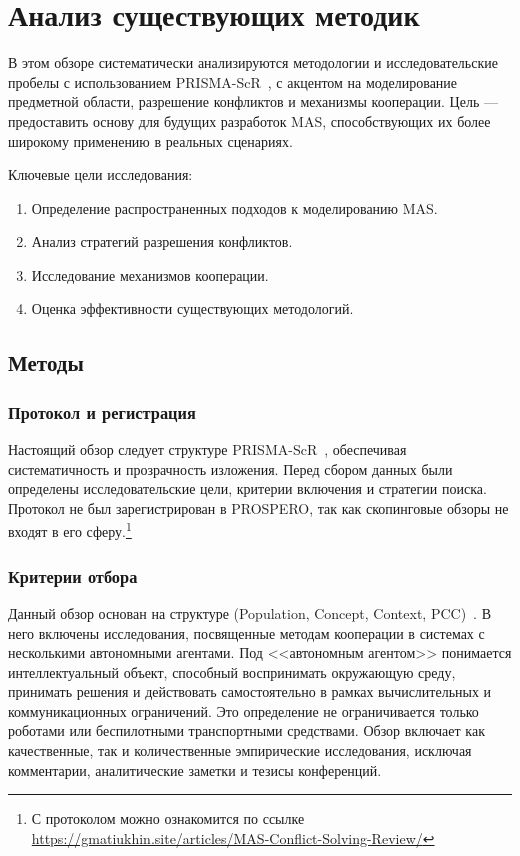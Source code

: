\chapter{Анализ существующих методик}

В этом обзоре систематически анализируются методологии и исследовательские пробелы
с использованием PRISMA-ScR~\cite{prisma-src}, с акцентом на моделирование предметной
области, разрешение конфликтов и механизмы кооперации. Цель --- предоставить основу
для будущих разработок MAS, способствующих их более широкому применению в реальных
сценариях.

Ключевые цели исследования:

\begin{enumerate}
  \item Определение распространенных подходов к моделированию MAS.
  \item Анализ стратегий разрешения конфликтов.
  \item Исследование механизмов кооперации.
  \item Оценка эффективности существующих методологий.
\end{enumerate}

\section{Методы} 

\subsection{Протокол и регистрация}

Настоящий обзор следует структуре PRISMA-ScR~\cite{prisma-src},
обеспечивая систематичность и прозрачность изложения.
Перед сбором данных были определены исследовательские цели,
критерии включения и стратегии поиска.
Протокол не был зарегистрирован в PROSPERO,
так как скопинговые обзоры не входят в его сферу.\footnote{С протоколом можно ознакомится по ссылке 
\url{https://gmatiukhin.site/articles/MAS-Conflict-Solving-Review/}}

\subsection{Критерии отбора}

Данный обзор основан на структуре 
(Population, Concept, Context, PCC)~\cite{afc61c6cf471416489e36a4bc382d3b9}.
В него включены исследования, посвященные методам кооперации в системах с несколькими автономными агентами.
Под <<автономным агентом>> понимается интеллектуальный объект,
способный воспринимать окружающую среду,
принимать решения и действовать самостоятельно в рамках вычислительных и коммуникационных ограничений.
Это определение не ограничивается только роботами или беспилотными транспортными средствами.
Обзор включает как качественные, 
так и количественные эмпирические исследования,
исключая комментарии, аналитические заметки и тезисы конференций.


